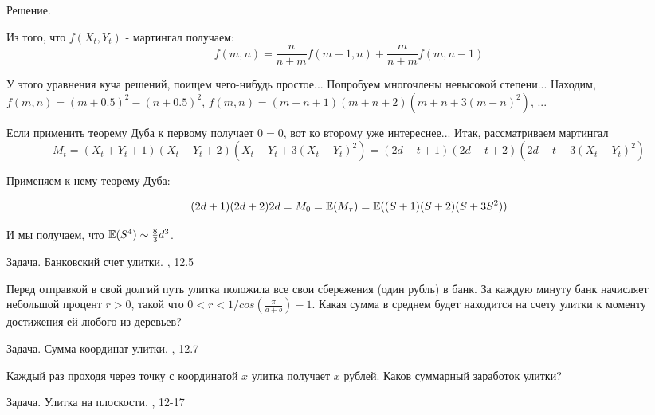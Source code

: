 {Решение.

Из того, что $f(X_{t},Y_{t})$ - мартингал получаем:
\begin{equation}
f(m,n)=\frac{n}{n+m}f(m-1,n)+\frac{m}{n+m}f(m,n-1)
\end{equation}

У этого уравнения куча решений, поищем чего-нибудь простое... Попробуем многочлены невысокой степени... Находим, $f(m,n)=(m+0.5)^{2}-(n+0.5)^{2}$, $f(m,n)=(m+n+1)(m+n+2)(m+n+3(m-n)^2)$, ...


Если применить теорему Дуба к первому получает $0=0$, вот ко второму уже интереснее... Итак, рассматриваем мартингал
\begin{equation}
M_{t}=(X_{t}+Y_{t}+1)(X_{t}+Y_{t}+2)(X_{t}+Y_{t}+3(X_{t}-Y_{t})^{2})=(2d-t+1)(2d-t+2)(2d-t+3(X_{t}-Y_{t})^{2})
\end{equation}

Применяем к нему теорему Дуба:

\begin{equation}
(2d+1)(2d+2)2d=M_{0}=\mathbb{E}(M_{\tau})=\mathbb{E}((S+1)(S+2)(S+3S^{2}))
\end{equation}

И мы получаем, что $\mathbb{E}(S^{4})\sim \frac{8}{3}d^{3}$.


Задача. Банковский счет улитки. \cite{stirzaker:prp}, 12.5

Перед отправкой в свой долгий путь улитка положила все свои сбережения (один рубль) в банк. За каждую минуту банк начисляет небольшой процент $r>0$, такой что $0<r<1/cos(\frac{\pi}{a+b})-1$. Какая сумма в среднем будет находится на счету улитки к моменту достижения ей любого из деревьев?

Задача. Сумма координат улитки. \cite{stirzaker:prp}, 12.7

Каждый раз проходя через точку с координатой $x$ улитка получает $x$ рублей. Каков суммарный заработок улитки?


Задача. Улитка на плоскости.  \cite{stirzaker:otep}, 12-17












}
